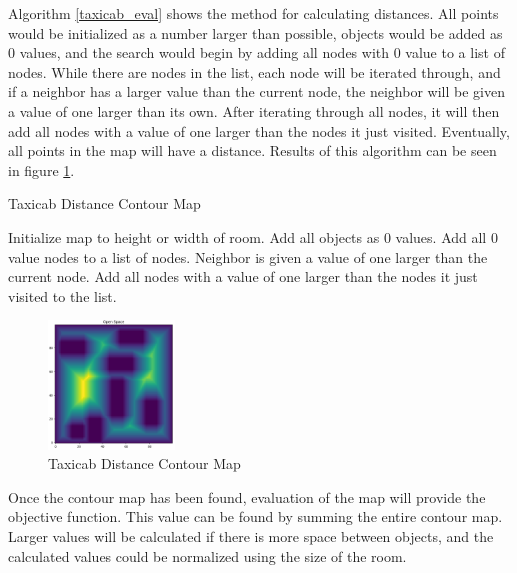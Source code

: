 \documentclass[conference]{IEEEtran}
\begin{document}
    Algorithm \ref{taxicab_eval} shows the method for calculating distances. All points would be initialized as a number larger than possible, objects would be added as 0 values, and the search would begin by adding all nodes with 0 value to a list of nodes. While there are nodes in the list, each node will be iterated through, and if a neighbor has a larger value than the current node, the neighbor will be given a value of one larger than its own. After iterating through all nodes, it will then add all nodes with a value of one larger than the nodes it just visited. Eventually, all points in the map will have a distance. Results of this algorithm can be seen in figure \ref{taxicab_dist_fig}.

    \begin{algorithm}
        \caption{Taxicab Distance Contour Map}
        \label{taxicab_eval}
        \begin{algorithmic}
        \STATE Initialize map to height or width of room.
        \STATE Add all objects as 0 values.
        \STATE Add all 0 value nodes to a list of nodes.
                        \STATE Neighbor is given a value of one larger than the current node.
                    \ENDIF
                \ENDFOR
            \ENDFOR
            \STATE Add all nodes with a value of one larger than the nodes it just visited to the list.
        \ENDWHILE
        \end{algorithmic}
    \end{algorithm}

    \begin{figure}
        \centering
        \includegraphics[width=0.3\textwidth]{contour_map_taxicab.png}
        \caption{Taxicab Distance Contour Map}
        \label{taxicab_dist_fig}
    \end{figure}

    Once the contour map has been found, evaluation of the map will provide the objective function. This value can be found by summing the entire contour map. Larger values will be calculated if there is more space between objects, and the calculated values could be normalized using the size of the room.
    
\end{document}
